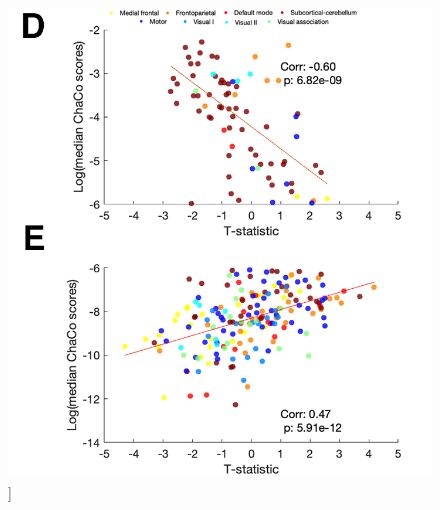 \documentclass[phd,tocprelim]{cornell}
\renewcommand{\caption}[1]{\singlespacing\hangcaption{#1}\normalspacing}
\begin{document}
\null
\vfill
\clearpage
\null
\vfill
\begin{figure}[h!]
		\ContinuedFloat
		\captionsetup{labelformat=adja-page}
    \centering
    \includegraphics[width=\textwidth]{chapter1/SupplementaryFigure11DE.png}
    \caption[]{}
\end{figure}
\null
\vfill
\clearpage
\null
\vfill
\end{document}
